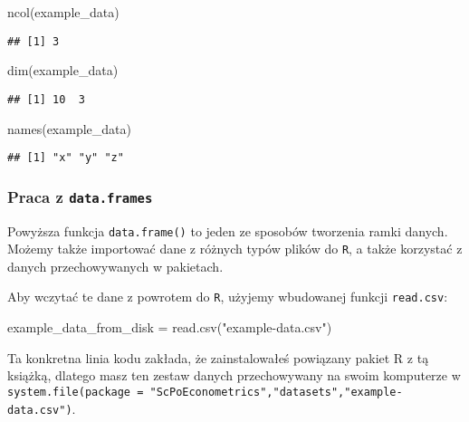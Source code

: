 \documentclass[
]{article}
\newenvironment{Shaded}{\begin{snugshade}}{\end{snugshade}}
\newcommand{\FunctionTok}[1]{\textcolor[rgb]{0.00,0.00,0.00}{#1}}
\newcommand{\NormalTok}[1]{#1}
\newcommand{\OtherTok}[1]{\textcolor[rgb]{0.56,0.35,0.01}{#1}}
\newcommand{\StringTok}[1]{\textcolor[rgb]{0.31,0.60,0.02}{#1}}
\begin{document}
\begin{Shaded}
\begin{Highlighting}[]
\FunctionTok{ncol}\NormalTok{(example\_data)}
\end{Highlighting}
\end{Shaded}

\begin{verbatim}
## [1] 3
\end{verbatim}

\begin{Shaded}
\begin{Highlighting}[]
\FunctionTok{dim}\NormalTok{(example\_data)}
\end{Highlighting}
\end{Shaded}

\begin{verbatim}
## [1] 10  3
\end{verbatim}

\begin{Shaded}
\begin{Highlighting}[]
\FunctionTok{names}\NormalTok{(example\_data)}
\end{Highlighting}
\end{Shaded}

\begin{verbatim}
## [1] "x" "y" "z"
\end{verbatim}

\hypertarget{praca-z-data.frames}{%
\subsubsection{\texorpdfstring{Praca z
\texttt{data.frames}}{Praca z data.frames}}\label{praca-z-data.frames}}

Powyższa funkcja \texttt{data.frame()} to jeden ze sposobów tworzenia
ramki danych. Możemy także importować dane z różnych typów plików do
\texttt{R}, a także korzystać z danych przechowywanych w pakietach.

Aby wczytać te dane z powrotem do \texttt{R}, użyjemy wbudowanej funkcji
\texttt{read.csv}:

\begin{Shaded}
\begin{Highlighting}[]
\NormalTok{example\_data\_from\_disk }\OtherTok{=} \FunctionTok{read.csv}\NormalTok{(}\StringTok{"example{-}data.csv"}\NormalTok{)}
\end{Highlighting}
\end{Shaded}

Ta konkretna linia kodu zakłada, że zainstalowałeś powiązany pakiet R z
tą książką, dlatego masz ten zestaw danych przechowywany na swoim
komputerze w
\texttt{system.file(package\ =\ "ScPoEconometrics","datasets","example-data.csv")}.
\end{document}
